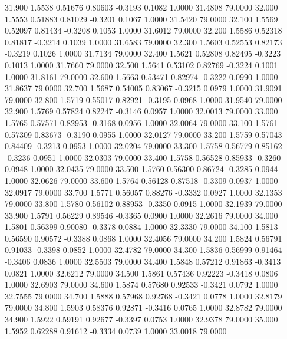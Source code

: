   31.900   1.5538   0.51676   0.80603  -0.3193   0.1082   1.0000  31.4808  79.0000
  32.000   1.5553   0.51883   0.81029  -0.3201   0.1067   1.0000  31.5420  79.0000
  32.100   1.5569   0.52097   0.81434  -0.3208   0.1053   1.0000  31.6012  79.0000
  32.200   1.5586   0.52318   0.81817  -0.3214   0.1039   1.0000  31.6583  79.0000
  32.300   1.5603   0.52553   0.82173  -0.3219   0.1026   1.0000  31.7134  79.0000
  32.400   1.5621   0.52808   0.82495  -0.3223   0.1013   1.0000  31.7660  79.0000
  32.500   1.5641   0.53102   0.82769  -0.3224   0.1001   1.0000  31.8161  79.0000
  32.600   1.5663   0.53471   0.82974  -0.3222   0.0990   1.0000  31.8637  79.0000
  32.700   1.5687   0.54005   0.83067  -0.3215   0.0979   1.0000  31.9091  79.0000
  32.800   1.5719   0.55017   0.82921  -0.3195   0.0968   1.0000  31.9540  79.0000
  32.900   1.5769   0.57824   0.82247  -0.3146   0.0957   1.0000  32.0013  79.0000
  33.000   1.5765   0.57571   0.82953  -0.3168   0.0956   1.0000  32.0064  79.0000
  33.100   1.5761   0.57309   0.83673  -0.3190   0.0955   1.0000  32.0127  79.0000
  33.200   1.5759   0.57043   0.84409  -0.3213   0.0953   1.0000  32.0204  79.0000
  33.300   1.5758   0.56779   0.85162  -0.3236   0.0951   1.0000  32.0303  79.0000
  33.400   1.5758   0.56528   0.85933  -0.3260   0.0948   1.0000  32.0435  79.0000
  33.500   1.5760   0.56300   0.86724  -0.3285   0.0944   1.0000  32.0626  79.0000
  33.600   1.5764   0.56128   0.87518  -0.3309   0.0937   1.0000  32.0917  79.0000
  33.700   1.5771   0.56057   0.88276  -0.3332   0.0927   1.0000  32.1353  79.0000
  33.800   1.5780   0.56102   0.88953  -0.3350   0.0915   1.0000  32.1939  79.0000
  33.900   1.5791   0.56229   0.89546  -0.3365   0.0900   1.0000  32.2616  79.0000
  34.000   1.5801   0.56399   0.90080  -0.3378   0.0884   1.0000  32.3330  79.0000
  34.100   1.5813   0.56590   0.90572  -0.3388   0.0868   1.0000  32.4056  79.0000
  34.200   1.5824   0.56791   0.91033  -0.3398   0.0852   1.0000  32.4782  79.0000
  34.300   1.5836   0.56999   0.91464  -0.3406   0.0836   1.0000  32.5503  79.0000
  34.400   1.5848   0.57212   0.91863  -0.3413   0.0821   1.0000  32.6212  79.0000
  34.500   1.5861   0.57436   0.92223  -0.3418   0.0806   1.0000  32.6903  79.0000
  34.600   1.5874   0.57680   0.92533  -0.3421   0.0792   1.0000  32.7555  79.0000
  34.700   1.5888   0.57968   0.92768  -0.3421   0.0778   1.0000  32.8179  79.0000
  34.800   1.5903   0.58376   0.92871  -0.3416   0.0765   1.0000  32.8782  79.0000
  34.900   1.5922   0.59191   0.92677  -0.3397   0.0753   1.0000  32.9378  79.0000
  35.000   1.5952   0.62288   0.91612  -0.3334   0.0739   1.0000  33.0018  79.0000

